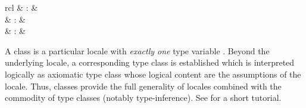 \begin{isabellebody}
\begin{isamarkuptext}
\begin{matharray}{rcl}
    \hypertarget{command.print-classes}{\hyperlink{command.print-classes}{\mbox{}}} & : &  \\
    \hypertarget{command.class-deps}{\hyperlink{command.class-deps}{\mbox{}}} & : &  \\
    \hypertarget{method.intro-classes}{\hyperlink{method.intro-classes}{\mbox{}}} & : &  \\
  \end{matharray}

  A class is a particular locale with \emph{exactly one} type variable
  .  Beyond the underlying locale, a corresponding type class
  is established which is interpreted logically as axiomatic type
  class \cite{Wenzel:1997:TPHOL} whose logical content are the
  assumptions of the locale.  Thus, classes provide the full
  generality of locales combined with the commodity of type classes
  (notably type-inference).  See \cite{isabelle-classes} for a short
  tutorial.


\end{isamarkuptext}
\end{isabellebody}
